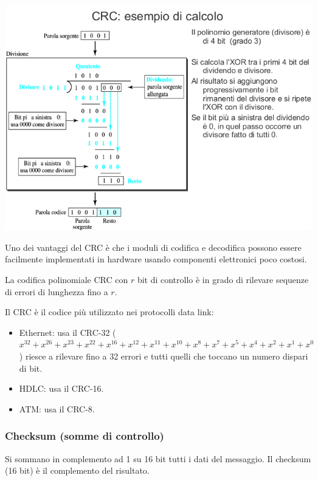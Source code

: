             \begin{center}
                \includegraphics[scale=0.4]{chapters/3/assets/schema_e.png}
            \end{center}

            Uno dei vantaggi del CRC è che i moduli di codifica e decodifica possono essere facilmente implementati in hardware usando componenti elettronici poco costosi.

            La codifica polinomiale CRC con $r$ bit di controllo è in grado di rilevare sequenze di errori di lunghezza fino a $r$.

            Il CRC è il codice più utilizzato nei protocolli data link:
            \begin{itemize}
                \item Ethernet: usa il CRC-32 ($x^{32} +x^{26} +x^{23} +x^{22} +x^{16} +x^{12} +x^{11} +x^{10} +x^8 + x^7 +x^5 +x^4 +x^2 +x^1 +x^0$) riesce a rilevare fino a 32 errori e tutti quelli che toccano un numero dispari di bit.
                \item HDLC: usa il CRC-16.
                \item ATM: usa il CRC-8.
            \end{itemize}

        \subsubsection{Checksum (somme di controllo)}
            Si sommano in complemento ad 1 su 16 bit tutti i dati del messaggio. Il checksum (16 bit) è il complemento del risultato.

